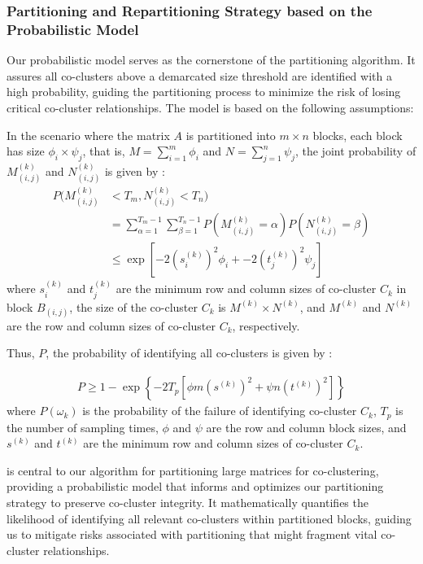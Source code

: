 \documentclass[journal]{IEEEtran}
\begin{document}
\subsubsection{Partitioning and Repartitioning Strategy based on the Probabilistic Model}

Our probabilistic model serves as the cornerstone of the partitioning algorithm. It assures all co-clusters above a demarcated size threshold are identified with a high probability, guiding the partitioning process to minimize the risk of losing critical co-cluster relationships. The model is based on the following assumptions:

In the scenario where the matrix $A$ is partitioned into $m \times n$ blocks, each block has size $\phi_i \times \psi_j$, that is, $M=\sum_{i=1}^m \phi_i$ and $N=\sum_{j=1}^n \psi_j$, the joint probability of $M_{(i,j)}^{(k)}$ and $N_{(i,j)}^{(k)}$ is given by :
\begin{align*}
  P(M_{(i,j)}^{(k)} & < T_m, N_{(i,j)}^{(k)} < T_n)                                                                           \\
                    & = \sum_{\alpha=1}^{T_m-1} \sum_{\beta=1}^{T_n-1} P(M_{(i,j)}^{(k)} = \alpha) P(N_{(i,j)}^{(k)} = \beta) \\
                    & \le \exp[-2 (s_i^{(k)})^2 \phi_i + -2 (t_j^{(k)})^2 \psi_j]
\end{align*}
where $s_i^{(k)}$ and $t_j^{(k)}$ are the minimum row and column sizes of co-cluster $C_k$ in block $B_{(i,j)}$, the size of the co-cluster $C_k$ is $M^{(k)} \times N^{(k)}$, and $M^{(k)}$ and $N^{(k)}$ are the row and column sizes of co-cluster $C_k$, respectively.

Thus, $P$, the probability of identifying all co-clusters is given by :

\begin{align}
  P \ge 1 - \exp \left\{ -2 T_p [\phi m (s^{(k)})^2 + \psi n (t^{(k)})^2] \right\} \label{eq:prob_of_identifying_all_co_clusters}
\end{align}
where $P(\omega_k)$ is the probability of the failure of identifying co-cluster $C_k$, $T_p$ is the number of sampling times, $\phi$ and $\psi$ are the row and column block sizes, and $s^{(k)}$ and $t^{(k)}$ are the minimum row and column sizes of co-cluster $C_k$.

 is central to our algorithm for partitioning large matrices for co-clustering, providing a probabilistic model that informs and optimizes our partitioning strategy to preserve co-cluster integrity. It mathematically quantifies the likelihood of identifying all relevant co-clusters within partitioned blocks, guiding us to mitigate risks associated with partitioning that might fragment vital co-cluster relationships.
\end{document}
